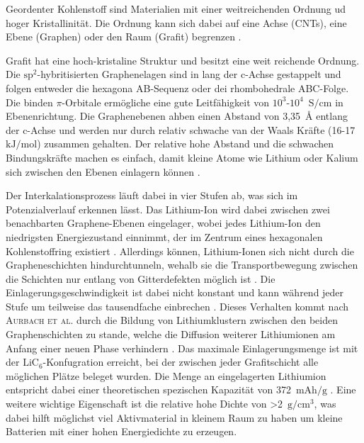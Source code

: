 Geordenter Kohlenstoff sind Materialien mit einer weitreichenden Ordnung ud hoger Kristallinität. Die Ordnung kann sich dabei auf eine Achse (CNTs), eine Ebene (Graphen) oder den Raum (Grafit) begrenzen \cite{Wang2021}.

Grafit hat eine hoch-kristaline Struktur und besitzt eine weit reichende Ordnung. Die $\text{sp}^\text{2}$-hybritisierten Graphenelagen sind in lang der c-Achse gestappelt und folgen entweder die hexagona AB-Sequenz oder dei rhombohedrale ABC-Folge. Die binden $\pi$-Orbitale ermögliche eine gute Leitfähigkeit von $10^3$-$10^4$~$\si{\siemens \per \cm}$ in Ebenenrichtung. Die Graphenebenen ahben einen Abstand von 3,35~$\si{\angstrom}$ entlang der c-Achse und werden nur durch relativ schwache van der Waals Kräfte (16-17~$\si{\kJ \per \mol}$) zusammen gehalten. Der relative hohe Abstand und die schwachen Bindungskräfte machen es einfach, damit kleine Atome wie Lithium oder Kalium sich zwischen den Ebenen einlagern können \cite{Wang2021}.

Der Interkalationsprozess läuft dabei in vier Stufen ab, was sich im Potenzialverlauf erkennen lässt. Das Lithium-Ion wird dabei zwischen zwei benachbarten Graphene-Ebenen eingelager, wobei jedes Lithium-Ion den niedrigsten Energiezustand einnimmt, der im Zentrum eines hexagonalen Kohlenstoffring existiert \cite{Sole2014,Weng2023}. Allerdings können, Lithium-Ionen sich nicht durch die Grapheneschichten hindurchtunneln, wehalb sie die Transportbewegung zwischen die Schichten nur entlang von Gitterdefekten möglich ist \cite{Nishidate2005}. Die Einlagerungsgeschwindigkeit ist dabei nicht konstant und kann während jeder Stufe um teilweise das tausendfache einbrechen \cite{Levi1997}. Dieses Verhalten kommt nach \textsc{Aurbach et al.} durch die Bildung von Lithiumklustern zwischen den beiden Graphenschichten zu stande, welche die Diffusion weiterer Lithiumionen am Anfang einer neuen Phase verhindern \cite{Markevich2005}.  Das maximale Einlagerungsmenge ist mit der $\text{LiC}_\text{6}$-Konfugration erreicht, bei der zwischen jeder Grafitschicht alle möglichen Plätze beleget wurden. Die Menge an eingelagerten Lithiumion entspricht dabei  einer theoretischen spezischen Kapazität von 372~$\si{\mA \hour \per \g}$ \cite{Winter1998}. 
Eine weitere wichtige Eigenschaft ist die relative hohe Dichte von >2~$\si{\g \per \cm \cubed}$, was dabei hilft möglichst viel Aktivmaterial in kleinem Raum zu haben um kleine Batterien mit einer hohen Energiedichte zu erzeugen.

